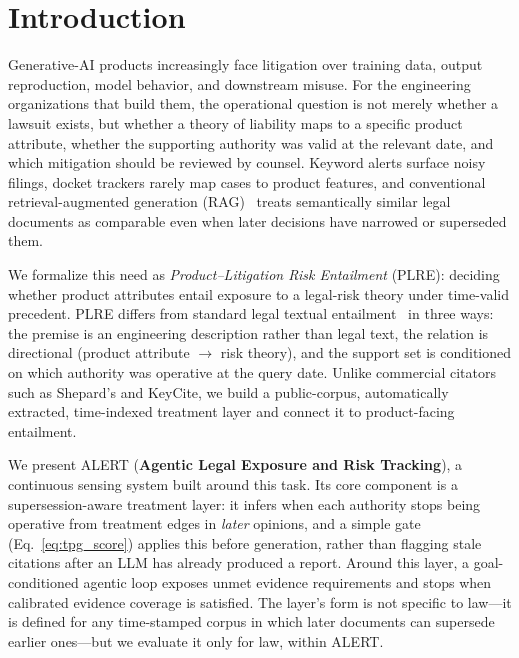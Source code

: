 \section{Introduction}

Generative-AI products increasingly face litigation over training data, output reproduction, model behavior, and downstream misuse. For the engineering organizations that build them, the operational question is not merely whether a lawsuit exists, but whether a theory of liability maps to a specific product attribute, whether the supporting authority was valid at the relevant date, and which mitigation should be reviewed by counsel. Keyword alerts surface noisy filings, docket trackers rarely map cases to product features, and conventional retrieval-augmented generation (RAG)~\citep{lewis2020retrieval} treats semantically similar legal documents as comparable even when later decisions have narrowed or superseded them.

We formalize this need as \emph{Product--Litigation Risk Entailment} (PLRE): deciding whether product attributes entail exposure to a legal-risk theory under time-valid precedent. PLRE differs from standard legal textual entailment~\citep{rabelo2022coliee} in three ways: the premise is an engineering description rather than legal text, the relation is directional (product attribute $\rightarrow$ risk theory), and the support set is conditioned on which authority was operative at the query date. Unlike commercial citators such as Shepard's and KeyCite, we build a public-corpus, automatically extracted, time-indexed treatment layer and connect it to product-facing entailment.

We present ALERT (\textbf{Agentic Legal Exposure and Risk Tracking}), a continuous sensing system built around this task. Its core component is a supersession-aware treatment layer: it infers when each authority stops being operative from treatment edges in \emph{later} opinions, and a simple gate (Eq.~\eqref{eq:tpg_score}) applies this before generation, rather than flagging stale citations after an LLM has already produced a report. Around this layer, a goal-conditioned agentic loop exposes unmet evidence requirements and stops when calibrated evidence coverage is satisfied. The layer's form is not specific to law---it is defined for any time-stamped corpus in which later documents can supersede earlier ones---but we evaluate it only for law, within ALERT.


